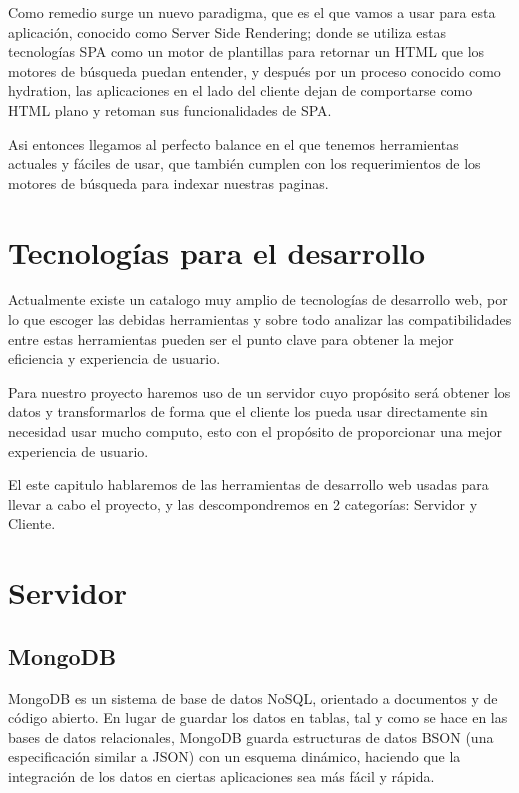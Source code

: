 Como remedio surge un nuevo paradigma, que es el que vamos a usar para esta aplicación, conocido como Server Side Rendering; donde se utiliza estas tecnologías SPA como un motor de plantillas para retornar un HTML que los motores de búsqueda puedan entender, y después por un proceso conocido como hydration, las aplicaciones en el lado del cliente dejan de comportarse como HTML plano y retoman sus funcionalidades de SPA.

Asi entonces llegamos al perfecto balance en el que tenemos herramientas actuales y fáciles de usar, que también cumplen con los requerimientos de los motores de búsqueda para indexar nuestras paginas.


\section{Tecnologías para el desarrollo}

Actualmente existe un catalogo muy amplio de tecnologías de desarrollo web, por lo que escoger las debidas herramientas y sobre todo analizar las compatibilidades entre estas herramientas pueden ser el punto clave para obtener la mejor eficiencia y experiencia de usuario. 

Para nuestro proyecto haremos uso de un servidor cuyo propósito será obtener los datos y transformarlos de forma que el cliente los pueda usar directamente sin necesidad usar mucho computo, esto con el propósito de proporcionar una mejor experiencia de usuario.

El este capitulo hablaremos de las herramientas de desarrollo web usadas para llevar a cabo el proyecto, y las descompondremos en 2 categorías: Servidor y Cliente.

\section{Servidor}

\subsection{MongoDB}

MongoDB es un sistema de base de datos NoSQL, orientado a documentos y de código abierto. En lugar de guardar los datos en tablas, tal y como se hace en las bases de datos relacionales, MongoDB guarda estructuras de datos BSON (una especificación similar a JSON) con un esquema dinámico, haciendo que la integración de los datos en ciertas aplicaciones sea más fácil y rápida.


